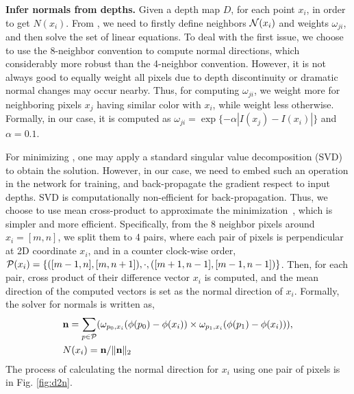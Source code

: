 \textbf{Infer normals from depths.} 
\label{chap:d2n}
Given a depth map $D$, for each point $x_i$, in order to get $N(x_i)$. From , we need to firstly define neighbors ${\mathcal N}(x_i)$ and weights $\omega_{ji}$, and then solve the set of linear equations. To deal with the first issue, we choose to use the 8-neighbor convention to compute normal directions, which considerably more robust than the 4-neighbor convention. 
However, it is not always good to equally weight all pixels due to depth discontinuity or dramatic normal changes may occur nearby. Thus, for computing $\omega_{ji}$, we weight more for neighboring pixels $x_j$ having similar color with $x_i$, while weight less otherwise. Formally, in our case, it is computed as $\omega_{ji} = \exp\{-\alpha|I(x_j) - I(x_i)|\}$ and $\alpha = 0.1$. 

For minimizing , one may apply a standard singular value decomposition (SVD) to obtain the solution. However, in our case, we need to embed such an operation in the network for training, and back-propagate the gradient respect to input depths. SVD is computationally non-efficient for back-propagation. Thus, we choose to use mean cross-product to approximate the minimization~\cite{jia2006using}, which is simpler and more efficient. 
Specifically, from the 8 neighbor pixels around $x_i = [m, n]$, we split them to 4 pairs, where each pair of pixels is perpendicular at 2D coordinate \wrt $x_i$, and in a counter clock-wise order, \ie ${\mathcal P}(x_i) = \{([m-1, n], [m, n+1]), \cdot, ([m+1, n-1], [m-1, n-1])\}$. 
Then, for each pair, cross product of their difference vector \wrt $x_i$ is computed, and the mean direction of the computed vectors is set as the normal direction of $x_i$. Formally, the solver for normals is written as, 
\begin{align}
\label{eq:cross}
&{\mathbf n} = \sum_{p\in{\mathcal P}}(\omega_{p_{0}, x_i}(\phi(p_{0}) - \phi(x_i)) \times \omega_{p_{1}, x_i}(\phi(p_{1}) - \phi(x_i))), \nonumber \\
&N(x_i) = {\mathbf n} / \|{\mathbf n}\|_2
\end{align}
The process of calculating the normal direction for $x_i$ using one pair of pixels is in Fig. \ref{fig:d2n}. 

